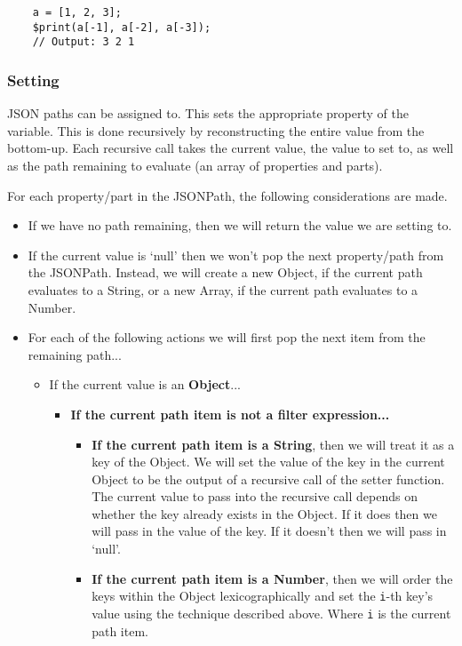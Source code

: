 \begin{verbatim}
    a = [1, 2, 3];
    $print(a[-1], a[-2], a[-3]);
    // Output: 3 2 1
\end{verbatim}

\subsubsection{Setting}
\label{sec:jsonpath-setting}

JSON paths can be assigned to. This sets the appropriate property of the variable. This is done recursively by reconstructing the entire value from the bottom-up. Each recursive call takes the current value, the value to set to, as well as the path remaining to evaluate (an array of properties and parts).

\begin{center}
    For each property/part in the JSONPath, the following considerations are made.
    \begin{itemize}
        \item If we have no path remaining, then we will return the value we are setting to.
        \item If the current value is `null' then we won't pop the next property/path from the JSONPath. Instead, we will create a new Object, if the current path evaluates to a String, or a new Array, if the current path evaluates to a Number.
        \item For each of the following actions we will first pop the next item from the remaining path...
        \begin{itemize}
            \item If the current value is an \textbf{Object}...
            \begin{itemize}
                \item \textbf{If the current path item is not a filter expression...}
                \begin{itemize}
                    \item \textbf{If the current path item is a String}, then we will treat it as a key of the Object. We will set the value of the key in the current Object to be the output of a recursive call of the setter function. The current value to pass into the recursive call depends on whether the key already exists in the Object. If it does then we will pass in the value of the key. If it doesn't then we will pass in `null'.
                    \item \textbf{If the current path item is a Number}, then we will order the keys within the Object lexicographically and set the \verb|i|-th key's value using the technique described above. Where \verb|i| is the current path item.

\end{itemize}
\end{itemize}
\end{itemize}
\end{itemize}
\end{center}

